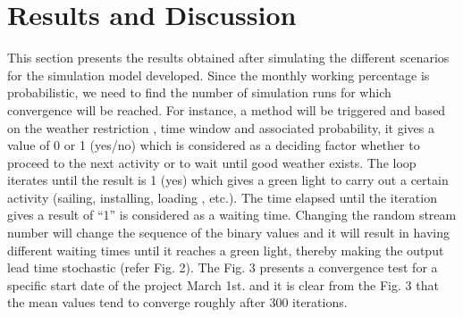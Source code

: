 \section{Results and Discussion}

This section presents the results obtained after simulating the different scenarios for the simulation model developed. Since the monthly working percentage is probabilistic, we need to find the number of simulation runs for which convergence will be reached. For instance, a method will be triggered and based on the weather restriction , time window and associated probability, it gives a value of 0 or 1 (yes/no) which is considered as a deciding factor whether to proceed to the next activity or to wait until good weather exists. The loop iterates until the result is 1 (yes) which gives a green light to carry out a certain activity (sailing, installing, loading , etc.). The time elapsed until the iteration gives a result of “1” is considered as a waiting time. Changing the random stream number will change the sequence of the binary values and it will result in having different waiting times until it reaches a green light, thereby making the output lead time stochastic (refer Fig. 2). The Fig. 3 presents a convergence test for a specific start date of the project March 1st. and it is clear from the Fig. 3 that the mean values tend to converge roughly after 300 iterations.